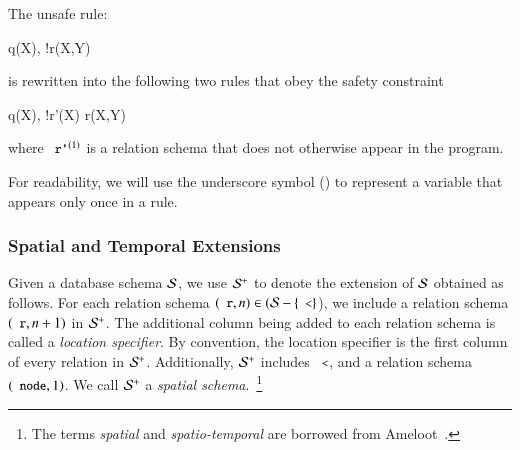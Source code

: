 \begin{example}
The unsafe rule:
\begin{Drules}
      {q(X), !r(X,Y)}
\end{Drules}
is rewritten into the following two rules that obey the safety constraint

\begin{Drules}
      {q(X), !r'(X)}
      {r(X,Y)}
\end{Drules}

where $\dedalus{r'}^{(1)}$ is a relation schema that does not otherwise appear in the program.
\end{example}

For readability, we will use the underscore symbol (\dedalus{_}) to represent a variable that appears only once in a rule.




\subsubsection{Spatial and Temporal Extensions}
\label{sec:st}

Given a database schema $\schema$, we use $\sschema$ to denote the extension of $\schema$
obtained as follows. For each relation schema $(\dedalus{r}, n) \in (\schema-\{\dedalus{<}\}$), we include a relation schema $(\dedalus{r}, n+1)$ in $\sschema$. The
additional column being added to each relation schema is called a {\em location specifier}. By convention, the
location specifier is the first column of every relation in $\sschema$.
Additionally, $\sschema$ includes $\dedalus{<}$, and a relation schema $(\dedalus{node},1)$.
We call $\sschema$ a {\em spatial schema}.~\footnote{The terms {\em spatial} and
  {\em spatio-temporal} are borrowed from Ameloot~\cite{ameloot-personal}.}

